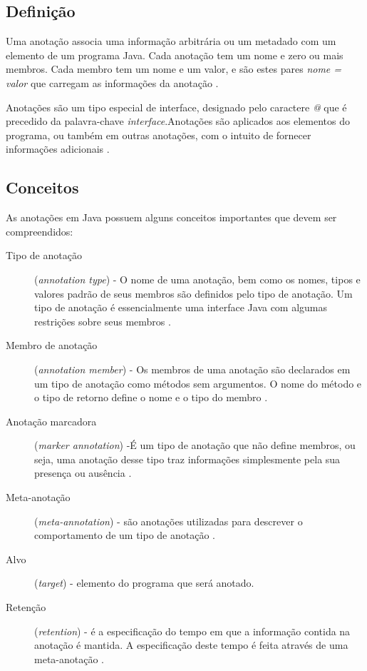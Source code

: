 \documentclass[tc,openright]{iiufrgs}
\begin{document}
\subsection{Definição}

Uma anotação associa uma informação arbitrária ou um metadado com um elemento de um programa Java. Cada anotação tem um nome e zero ou mais membros. Cada membro tem um nome e um valor, e são
estes pares \textit{nome = valor} que carregam as informações da anotação \cite{flanagan2005java}.

Anotações são um tipo especial de interface, designado pelo caractere \textit{@} que é precedido da palavra-chave \textit{interface}.Anotações são aplicados aos elementos do programa, ou também em outras anotações, com o intuito de fornecer informações adicionais \cite{arnold2000java}.

\subsection{Conceitos}

As anotações em Java possuem alguns conceitos importantes que devem ser compreendidos: 

\begin{description}
\item [Tipo de anotação] (\textit{annotation type}) - O nome de uma anotação, bem como os nomes, tipos e valores padrão de seus membros são definidos pelo tipo de anotação. Um tipo de anotação é essencialmente uma interface Java com algumas restrições sobre seus membros \cite{flanagan2005java}.
\item [Membro de anotação] (\textit{annotation member}) - Os membros de uma anotação são declarados em um tipo de anotação como métodos sem argumentos. O nome do método e o tipo de retorno define o nome e o
tipo do membro \cite{flanagan2005java}.
\item [Anotação marcadora] (\textit{marker annotation}) -É um tipo de anotação que não define membros, ou seja, uma anotação desse tipo traz informações simplesmente pela sua presença ou ausência \cite{flanagan2005java}.
\item [Meta-anotação] (\textit{meta-annotation}) - são anotações utilizadas para descrever o comportamento de um tipo de anotação \cite{horstmann2004core}.
\item [Alvo] (\textit{target}) - elemento do programa que será anotado.
\item [Retenção] (\textit{retention}) - é a especificação do tempo em que a informação contida na anotação é mantida. A especificação deste tempo é feita através de uma meta-anotação \cite{flanagan2005java}.
\end{description}
\end{document}
